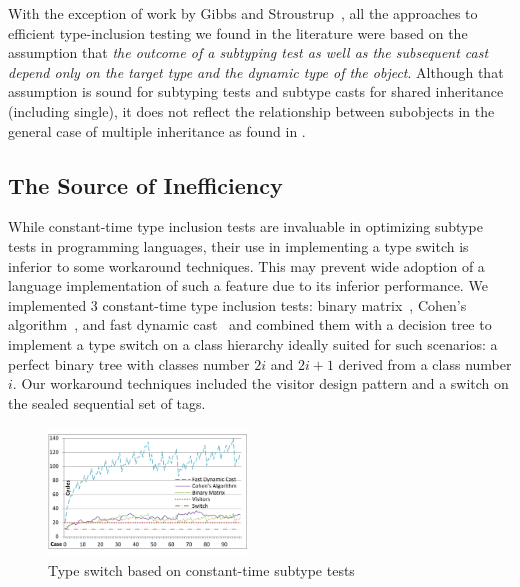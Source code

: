 With the exception of work by Gibbs and Stroustrup~\cite{FastDynCast}, all the 
approaches to efficient type-inclusion testing we found in the literature were 
based on the assumption that \emph{the outcome of a subtyping test as well as 
the subsequent cast depend only on the target type and the dynamic type of 
the object}. Although that assumption is sound for subtyping tests and subtype 
casts for shared inheritance (including single), it does not reflect the 
relationship between subobjects in the general case of multiple inheritance 
as found in \Cpp{}.

\subsection{The Source of Inefficiency}

While constant-time type inclusion tests are invaluable in optimizing subtype 
tests in programming languages, their use in implementing a type switch is 
inferior to some workaround techniques. This may prevent wide adoption of a 
language implementation of such a feature due to its inferior performance. 
We implemented 3 constant-time type inclusion tests: binary 
matrix~\cite{Vitek97}, Cohen's algorithm~\cite{Cohen91}, and fast dynamic 
cast~\cite{FastDynCast} and combined them with a decision tree to implement a 
type switch on a class hierarchy ideally suited for such scenarios: a perfect binary tree with 
classes number $2i$ and $2i+1$ derived from a class number $i$. Our workaround 
techniques included the visitor design pattern and a switch on the sealed sequential 
set of tags.

\begin{figure}[htbp]
  \centering
    \includegraphics[width=0.47\textwidth]{DCast-vs-Visitors.pdf}
  \caption{Type switch based on constant-time subtype tests}
  \label{fig:DCastVis2}
\end{figure}

